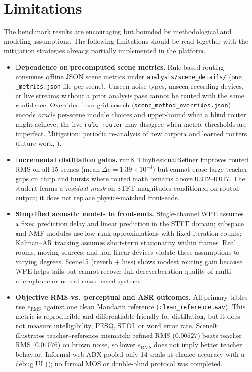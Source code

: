 \section{Limitations}
\label{sec:limitations}

The benchmark results are encouraging but bounded by methodological and modeling assumptions. The following limitations should be read together with the mitigation strategies already partially implemented in the platform.

\begin{itemize}
  \item \textbf{Dependence on precomputed scene metrics.}
    Rule-based routing consumes offline JSON scene metrics under \texttt{analysis/scene\_details/} (one \texttt{\_metrics.json} file per scene).
    Unseen noise types, unseen recording devices, or live streams without a prior analysis pass cannot be routed with the same confidence.
    Overrides from grid search (\texttt{scene\_method\_}\allowbreak\texttt{overrides.json}) encode \emph{oracle} per-scene module choices and upper-bound what a blind router might achieve; the live \texttt{rule\_router} may disagree when metric thresholds are imperfect.
    Mitigation: periodic re-analysis of new corpora and learned routers (future work, ).

  \item \textbf{Incremental distillation gains.}
  runK TinyResidualRefiner improves routed RMS on all 15 scenes (mean $\Delta e = 1.39\times 10^{-3}$) but cannot erase large teacher gaps on chirp and bursts where routed math remains above $0.012$--$0.017$. The student learns a \emph{residual mask} on STFT magnitudes conditioned on routed output; it does not replace physics-matched front-ends.

  \item \textbf{Simplified acoustic models in front-ends.}
  Single-channel WPE assumes a fixed prediction delay and linear prediction in the STFT domain; subspace and NMF modules use low-rank approximations with fixed iteration counts; Kalman--AR tracking assumes short-term stationarity within frames. Real rooms, moving sources, and non-linear devices violate these assumptions to varying degrees. Scene15 (reverb + hiss) shows modest routing gain because WPE helps tails but cannot recover full dereverberation quality of multi-microphone or neural mask-based systems.

  \item \textbf{Objective RMS vs.\ perceptual and ASR outcomes.}
  All primary tables use $e_{\mathrm{RMS}}$ against one clean Mandarin reference (\texttt{clean\_reference.wav}). This metric is reproducible and differentiable-friendly for distillation, but it does not measure intelligibility, PESQ, STOI, or word error rate. Scene04 illustrates teacher--reference mismatch: refined RMS ($0.00527$) beats teacher RMS ($0.01076$) on brown noise, so lower $e_{\mathrm{RMS}}$ does not imply better teacher behavior. Informal web ABX pooled only 14 trials at chance accuracy with a debug UI (); no formal MOS or double-blind protocol was completed.


\end{itemize}
